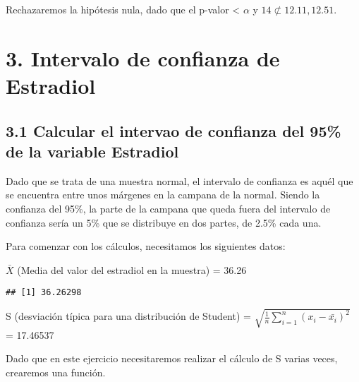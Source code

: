 \documentclass[
]{article}
\newenvironment{Shaded}{\begin{snugshade}}{\end{snugshade}}
\newcommand{\KeywordTok}[1]{\textcolor[rgb]{0.13,0.29,0.53}{\textbf{#1}}}
\newcommand{\NormalTok}[1]{#1}
\newcommand{\OperatorTok}[1]{\textcolor[rgb]{0.81,0.36,0.00}{\textbf{#1}}}
\newcommand{\StringTok}[1]{\textcolor[rgb]{0.31,0.60,0.02}{#1}}
\begin{document}
Rechazaremos la hipótesis nula, dado que el p-valor \textless{}
\(\alpha\) y \(14 \not \subset {12.11, 12.51}\).

\hypertarget{intervalo-de-confianza-de-estradiol}{%
\section{3. Intervalo de confianza de
Estradiol}\label{intervalo-de-confianza-de-estradiol}}

\hypertarget{calcular-el-intervao-de-confianza-del-95-de-la-variable-estradiol}{%
\subsection{3.1 Calcular el intervao de confianza del 95\% de la
variable
Estradiol}\label{calcular-el-intervao-de-confianza-del-95-de-la-variable-estradiol}}

Dado que se trata de una muestra normal, el intervalo de confianza es
aquél que se encuentra entre unos márgenes en la campana de la normal.
Siendo la confianza del 95\%, la parte de la campana que queda fuera del
intervalo de confianza sería un 5\% que se distribuye en dos partes, de
2.5\% cada una.

Para comenzar con los cálculos, necesitamos los siguientes datos:

\(\bar{X}\) (Media del valor del estradiol en la muestra) = 36.26

\begin{Shaded}
\end{Shaded}

\begin{verbatim}
## [1] 36.26298
\end{verbatim}

S (desviación típica para una distribución de Student) =
\(\sqrt{\frac{1}{n}\sum_{i = 1}^{n}(x_i - \bar{x_i})^2}\) = 17.46537

Dado que en este ejercicio necesitaremos realizar el cálculo de S varias
veces, crearemos una función.
\end{document}

